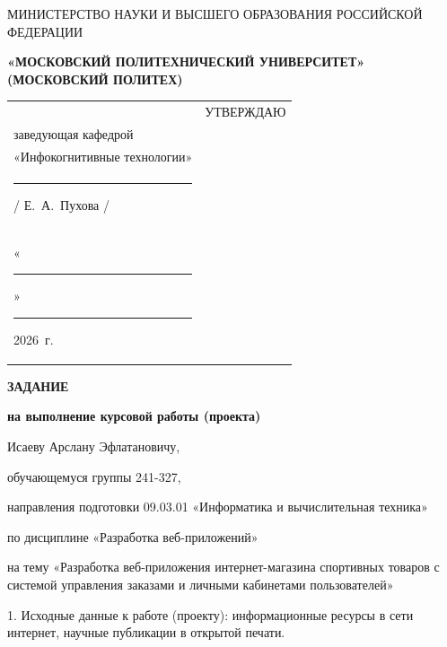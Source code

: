\documentclass[14pt, a4paper]{extarticle}
\begin{document}
\pagestyle{empty}


\begin{center}
    {\small МИНИСТЕРСТВО НАУКИ И ВЫСШЕГО ОБРАЗОВАНИЯ РОССИЙСКОЙ ФЕДЕРАЦИИ}


    {\small \textbf{«МОСКОВСКИЙ ПОЛИТЕХНИЧЕСКИЙ УНИВЕРСИТЕТ»}} \\
    {\small \textbf{(МОСКОВСКИЙ ПОЛИТЕХ)}}
\end{center}

\begin{tabularx}{\textwidth}{@{} p{} p{} @{}}
     &
    \raggedright
    УТВЕРЖДАЮ                          \\
    заведующая кафедрой                \\
    «Инфокогнитивные технологии»       \\[0.3cm]

    \rule{3cm}{0.4pt} / Е.~А.~Пухова / \\[0.1cm]

    «\rule{0.8cm}{0.4pt}» \rule{3cm}{0.4pt} 2026~г.
\end{tabularx}


\begin{center}

    { \large \textbf{ЗАДАНИЕ}}

    \textbf{на выполнение курсовой работы (проекта)}

    Исаеву Арслану Эфлатановичу, %

\end{center}

обучающемуся группы 241-327,

направления подготовки 09.03.01 «Информатика и вычислительная техника»

по дисциплине «Разработка веб-приложений»

на тему «Разработка веб-приложения интернет-магазина спортивных товаров с
системой управления заказами и личными кабинетами пользователей»

1. Исходные данные к работе (проекту): информационные ресурсы в сети
интернет, научные публикации в открытой печати.
\end{document}
